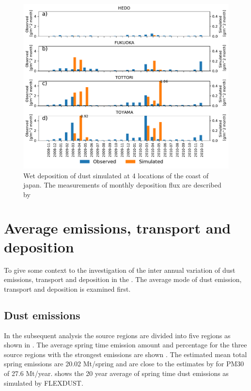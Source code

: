\begin{figure}[hptb]
    \centering
    \includegraphics[width=\textwidth]{texfiles/figs/monthly_accumulated_wet_depostion_japan.pdf}
    \caption{Wet deposition of dust simulated at 4 locations of the coast of japan. The measurements of monthly deposition flux are described by \textcite{osada2014wet}}
    \label{fig:model_eval_wet_deposition}
\end{figure}

\section{Average emissions, transport and deposition}\label{sec:result_average}
To give some context to the investigation of the inter annual variation of dust emissions, transport and deposition in the . The average mode of dust emission, transport and deposition is examined first. 
\subsection{Dust emissions}
In the subsequent analysis the source regions are divided into five regions as shown in . The average spring time emission amount and percentage for the three source regions with the strongest emissions are shown . The estimated mean total spring emissions are 20.02 Mt/spring and are close to the estimates by \textcite{xuan2004identification} for PM30 of 27.6 Mt/year. 
 shows the 20 year average of spring time dust emissions as simulated by FLEXDUST.


